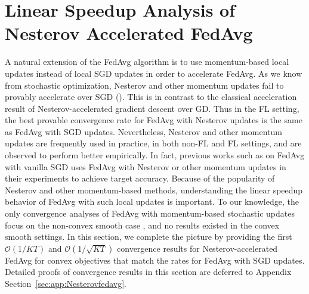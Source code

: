 


\section{Linear Speedup Analysis of Nesterov Accelerated FedAvg}
\label{sec:Nesterov}

{\color{red}A natural extension of the FedAvg algorithm is to use momentum-based 
local updates instead of local SGD updates in order to accelerate FedAvg. As we know from stochastic optimization, Nesterov and other momentum
updates fail to provably accelerate over SGD (\cite{liu2018accelerating,kidambi2018insufficiency,liu2018toward,yuan2020federated}). This is in contrast to the classical acceleration result of Nesterov-accelerated gradient descent over GD. Thus in the FL setting, the best provable convergence rate for FedAvg with Nesterov updates is the same as FedAvg with SGD updates. Nevertheless, Nesterov and other momentum updates are frequently used in practice, in both non-FL and FL settings, and are observed to perform better empirically. In fact, previous works such as \cite{stich2018local} on FedAvg with vanilla SGD uses FedAvg with Nesterov or other momentum updates in their experiments to achieve target accuracy. Because of the popularity of Nesterov and other momentum-based methods, understanding the linear speedup behavior of FedAvg with such local updates is important.} To our knowledge, the
only convergence analyses of FedAvg with momentum-based stochastic
updates focus on the non-convex smooth case \cite{huo2020faster,yu2019linear,li2018federated}, and no results existed in the convex smooth settings. In this section, we complete the picture by providing the first $\mathcal{O}(1/KT)$
and $\mathcal{O}(1/\sqrt{KT})$ convergence results for Nesterov-accelerated
FedAvg for convex objectives that match the rates for FedAvg with SGD updates. Detailed proofs of convergence results in this section are deferred to Appendix Section~\ref{sec:app:Nesterovfedavg}.

